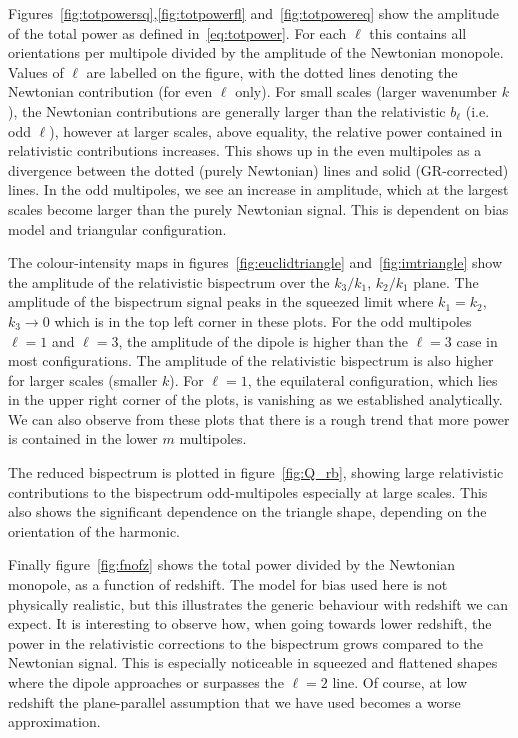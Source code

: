 {Figures~\ref{fig:totpowersq},\ref{fig:totpowerfl} and~\ref{fig:totpowereq} show the amplitude of the total power as defined in~\eqref{eq:totpower}. For each $\ell$ this contains all orientations per multipole divided by the amplitude of the Newtonian monopole. Values of \(\ell\) are labelled on the figure, with the dotted lines denoting the Newtonian contribution (for even \(\ell\) only). For small scales (larger wavenumber \(k\)), the Newtonian contributions are generally larger than the relativistic \(b_\ell\) (i.e. odd \(\ell\)), however at larger scales,  above equality, the relative power contained in relativistic contributions increases. This shows up in the even multipoles as a divergence between the dotted (purely Newtonian) lines and solid (GR-corrected) lines. In the odd multipoles, we see an increase in amplitude, which at the largest scales become larger than the purely Newtonian signal. This is dependent on bias model and triangular configuration.

The colour-intensity maps in figures~\ref{fig:euclidtriangle} and~\ref{fig:imtriangle} show the amplitude of the relativistic bispectrum over the \(k_3/k_1\), \(k_2/k_1\) plane. The amplitude of the bispectrum signal peaks in the squeezed limit where \(k_1=k_2\), \(k_3\to 0\) which is in the top left corner in these plots. For the odd multipoles \(\ell = 1\) and \(\ell = 3\),  the amplitude of the dipole is higher than the \(\ell=3\) case in most configurations. The amplitude of the relativistic bispectrum is also higher for larger scales (smaller \(k\)). For \(\ell = 1\), the equilateral configuration, which lies in the upper right corner of the plots, is vanishing as we established analytically. 
We can also observe from these plots that there is a rough trend that more power is contained in the lower $m$ multipoles.

The reduced bispectrum is plotted in figure~\ref{fig:Q_rb}, showing large relativistic contributions to the bispectrum odd-multipoles especially at large scales. This also shows the significant dependence on the triangle shape, depending on the orientation of the harmonic.  

Finally figure~\ref{fig:fnofz} shows the total power divided by the Newtonian monopole, as a function of redshift. The model for bias used here is not physically realistic, but this illustrates the generic behaviour with redshift we can expect. It is interesting to observe how, when going towards lower redshift, the power in the relativistic corrections to the bispectrum grows compared to the Newtonian signal. This is especially noticeable in squeezed and flattened shapes where the dipole approaches or surpasses the \(\ell = 2\) line. Of course, at low redshift the plane-parallel assumption that we have used becomes a worse approximation.

}
